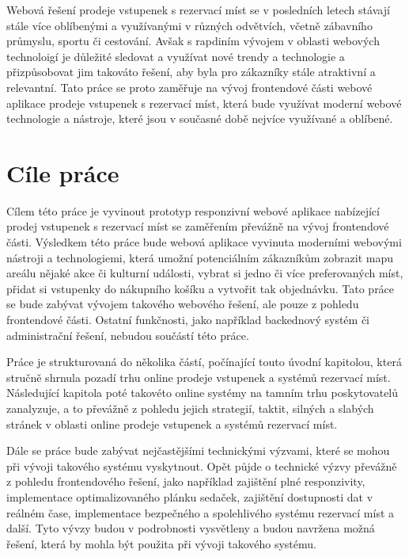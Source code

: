 Webová řešení prodeje vstupenek s rezervací míst se v posledních letech stávají stále více oblíbenými a využívanými v různých odvětvích, včetně zábavního průmyslu, sportu či cestování. Avšak s rapdiním vývojem v oblasti webových technoloigí je důležité sledovat a využívat nové trendy a technologie a přizpůsobovat jim takováto řešení, aby byla pro zákazníky stále atraktivní a relevantní. Tato práce se proto zaměřuje na vývoj frontendové části webové aplikace prodeje vstupenek s rezervací míst, která bude využívat moderní webové technologie a nástroje, které jsou v současné době nejvíce využívané a oblíbené.

\section*{Cíle práce}
\label{sec:uvod-cile-prace}
Cílem této práce je vyvinout prototyp responzivní webové aplikace nabízející prodej vstupenek s rezervací míst se zaměřením převážně na vývoj frontendové části. Výsledkem této práce bude webová aplikace vyvinuta moderními webovými nástroji a technologiemi, která umožní potenciálním zákazníkům zobrazit mapu areálu nějaké akce či kulturní události, vybrat si jedno či více preferovaných míst, přidat si vstupenky do nákupního košíku a vytvořit tak objednávku. Tato práce se bude zabývat vývojem takového webového řešení, ale pouze z pohledu frontendové části. Ostatní funkčnosti, jako například backednový systém či administrační řešení, nebudou součástí této práce.

Práce je strukturovaná do několika částí, počínající touto úvodní kapitolou, která stručně shrnula pozadí trhu online prodeje vstupenek a systémů rezervací míst. Následující kapitola poté takovéto online systémy na tamním trhu poskytovatelů zanalyzuje, a to převážně z pohledu jejich strategií, taktit, silných a slabých stránek v oblasti online prodeje vstupenek a systémů rezervací míst.

Dále se práce bude zabývat nejčastějšími technickými výzvami, které se mohou při vývoji takového systému vyskytnout. Opět půjde o technické výzvy převážně z pohledu frontendového řešení, jako například zajištění plné responzivity, implementace optimalizovaného plánku sedaček, zajištění dostupnosti dat v reálném čase, implementace bezpečného a spolehlivého systému rezervací míst a další. Tyto vývzy budou v podrobnosti vysvětleny a budou navržena možná řešení, která by mohla být použita při vývoji takového systému.

